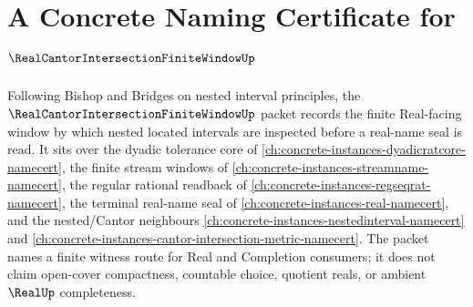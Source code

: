 \chapter{A Concrete Naming Certificate for $\RealCantorIntersectionFiniteWindowUp$}
\label{ch:concrete-instances-real-cantor-intersection-finite-window-namecert}

Following Bishop and Bridges on nested interval principles, the $\RealCantorIntersectionFiniteWindowUp$ packet records the finite Real-facing window by which nested located intervals are inspected before a real-name seal is read. It sits over the dyadic tolerance core of \autoref{ch:concrete-instances-dyadicratcore-namecert}, the finite stream windows of \autoref{ch:concrete-instances-streamname-namecert}, the regular rational readback of \autoref{ch:concrete-instances-regseqrat-namecert}, the terminal real-name seal of \autoref{ch:concrete-instances-real-namecert}, and the nested/Cantor neighbours \autoref{ch:concrete-instances-nestedinterval-namecert} and \autoref{ch:concrete-instances-cantor-intersection-metric-namecert}. The packet names a finite witness route for Real and Completion consumers; it does not claim open-cover compactness, countable choice, quotient reals, or ambient $\RealUp$ completeness.

